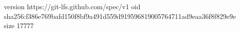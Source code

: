 version https://git-lfs.github.com/spec/v1
oid sha256:f386e769bafd150f8bf9a491d559d919596819005764711ad9eaa36f8f829e9e
size 17777
